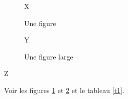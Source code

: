 \documentclass[twocolumn]{article}
\begin{document}
\begin{figure}[ht]
\centering X
\caption{Une figure}\label{f1}
\end{figure}
\begin{figure}[t]
\centering Y
\caption{Une figure large}\label{f2}
\end{figure}
\begin{table}[ht]
\caption{Un tableau}\label{t1}
\centering Z
\end{table}
Voir les figures \ref{f1} et \ref{f2} et le tableau \ref{t1}.
\end{document}
